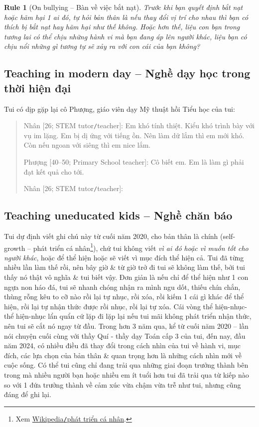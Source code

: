 \documentclass[12pt,twoside]{book}
\newtheorem{Rule}{Rule}
\begin{document}
\begin{Rule}[On bullying -- Bàn về việc bắt nạt]
	Trước khi bạn quyết định bắt nạt hoặc hãm hại 1 ai đó, tự hỏi bản thân là nếu thay đổi vị trí cho nhau thì bạn có thích bị bắt nạt hay hãm hại như thế không. Hoặc hơn thế, liệu con bạn trong tương lai có thể chịu những hành vi mà bạn đang áp lên người khác, liệu bạn có chịu nổi những gì tương tự sẽ xảy ra với con cái của bạn không?
\end{Rule}

\subsection{Teaching in modern day -- Nghề dạy học trong thời hiện đại}
Tui có dịp gặp lại cô Phượng, giáo viên dạy Mỹ thuật hồi Tiểu học của tui:

\begin{quote}
	{\sf Nhân [26; STEM tutor{\tt/}teacher]}: Em khó tính thiệt. Kiểu khó trình bày với vụ im lặng. Em bị dị ứng với tiếng ồn. Nên làm dữ lắm thì em mới khó. Còn nếu ngoan với siêng thì em nice lắm.
	
	{\sf Phượng [40--50; Primary School teacher]}: Cô biết em. Em là làm gì phải đạt kết quả cho tới.
	
	{\sf Nhân [26; STEM tutor{\tt/}teacher]}: 
\end{quote}


\subsection{Teaching uneducated kids -- Nghề chăn báo}
Tui dự định viết ghi chú này từ cuối năm 2020, cho bản thân là chính (self-growth -- phát triển cá nhân\footnote{Xem \href{https://vi.wikipedia.org/wiki/Phat_trien_ca_nhan}{Wikipedia{\tt/}phát triển cá nhân}.}), chứ tui không viết {\it vì ai đó hoặc vì muốn tốt cho người khác}, hoặc để thể hiện hoặc sẽ viết vì mục đích thể hiện cả. Tui đã từng nhiều lần làm thế rồi, nên bây giờ \& từ giờ trở đi tui sẽ không làm thế, bởi tui thấy nó thật vô nghĩa \& tui biết vậy. Đơn giản là nếu chỉ để thể hiện như 1 con ngựa non háo đá, tui sẽ nhanh chóng nhận ra mình ngu dốt, thiếu chín chắn, thùng rỗng kêu to cỡ nào rồi lại tự nhục, rồi xóa, rồi kiếm 1 cái gì khác để thể hiện, rồi lại tự nhận thức được rồi nhục, rồi lại tự xóa. Cái vòng thể hiện-nhục-thể hiện-nhục lẩn quẩn cứ lặp đi lặp lại nếu tui mãi không phát triển nhận thức, nên tui sẽ cắt nó ngay từ đầu. Trong hơn 3 năm qua, kể từ cuối năm 2020 -- lần nói chuyện cuối cùng với thầy Quí - thầy dạy Toán cấp 3 của tui, đến nay, đầu năm 2024, có nhiều điều đã thay đổi trong cách nhìn của tui về hành vi, mục đích, các lựa chọn của bản thân \& quan trọng hơn là những cách nhìn mới về cuộc sống. Có thể tui cũng chỉ đang trải qua những giai đoạn trưởng thành bên trong mà nhiều người bạn hoặc nhiều em ít tuổi hơn tui đã trải qua từ kiếp nào so với 1 đứa trưởng thành về cảm xúc vừa chậm vừa trễ như tui, nhưng cũng đáng để ghi lại.
\end{document}
